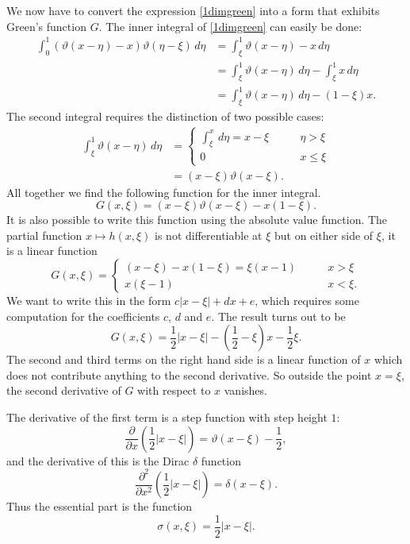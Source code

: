 We now have to convert the expression \eqref{1dimgreen} into a form
that exhibits Green's function $G$.
The inner integral of \eqref{1dimgreen} can easily be done:
\begin{align*}
\int_0^1(\vartheta(x-\eta)-x)\vartheta(\eta-\xi)\,d\eta
&=
\int_\xi^1\vartheta(x-\eta)-x\,d\eta
\\
&=
\int_\xi^1\vartheta(x-\eta)\,d\eta-\int_\xi^1x\,d\eta
\\
&=
\int_\xi^1\vartheta(x-\eta)\,d\eta-(1-\xi)x.
\end{align*}
The second integral requires the distinction of two possible cases:
\begin{align*}
\int_\xi^1\vartheta(x-\eta)\,d\eta
&=
\begin{cases}
\int_\xi^x\,d\eta=x-\xi&\qquad\eta>\xi\\
0&\qquad x\le \xi
\end{cases}
\\
&=(x-\xi)\vartheta(x-\xi).
\end{align*}
All together we find the following function for the inner integral.
\[
G(x,\xi)=(x-\xi)\vartheta(x-\xi)-x(1-\xi).
\]
It is also possible to write this function using the 
absolute value function.
The partial function $x\mapsto h(x,\xi)$ is not differentiable at $\xi$
but on either side of $\xi$, it is a linear function
\[
G(x,\xi)=\begin{cases}
(x-\xi)-x(1-\xi)=\xi(x-1)&\qquad x>\xi\\
x(\xi-1)&\qquad x<\xi.
\end{cases}
\]
We want to write this in the form $c|x-\xi|+dx+e$, which requires
some computation for the coefficients $c$, $d$ and $e$.
The result turns out to be
\[
G(x,\xi)
=
{\textstyle \frac12}|x-\xi|-({\textstyle \frac12}-\xi)x-{\textstyle\frac12}\xi.
\]
The second and third terms on the right hand side is a linear function
of $x$ which does not contribute anything to the second derivative.
So outside the point $x=\xi$, the second derivative of $G$ with respect 
to $x$ vanishes.

The derivative of the first term is a step function with step
height $1$:
\[
\frac{\partial}{\partial x}({\textstyle \frac12}|x-\xi|)
=
\vartheta(x-\xi)
-
{\textstyle\frac12},
\]
and the derivative of this is the Dirac $\delta$ function
\[
\frac{\partial^2}{\partial x^2}({\textstyle \frac12}|x-\xi|)
=
\delta(x-\xi).
\]
Thus the essential part is the function
\begin{equation}
\sigma(x,\xi)=\frac12|x-\xi|.
\label{n1sigma}
\end{equation}

